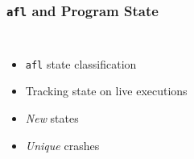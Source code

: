 \begin{frame}
\frametitle{\texttt{afl} and Program State}

\begin{columns}[c]


\begin{itemize}
    \item \texttt{afl} state classification
    \item Tracking state on live executions
    \item \textit{New} states
    \item \textit{Unique} crashes
\end{itemize}

\end{columns}

\end{frame}
